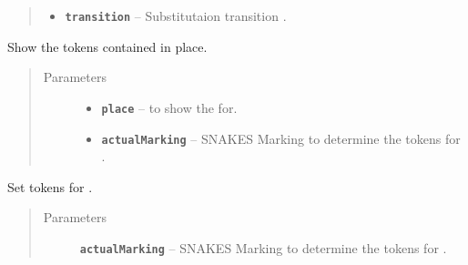 \documentclass[a4paper,10pt,english]{sphinxmanual}
\begin{document}
\begin{fulllineitems}
\begin{fulllineitems}
\begin{quote}
\begin{description}
\begin{itemize}
\item {} 
\textbf{\texttt{transition}} -- Substitutaion transition .

\end{itemize}

\end{description}\end{quote}

\end{fulllineitems}


\begin{fulllineitems}
\label{gui_link:gui.DiagramEditor.DiagramEditor.setTokenForPlace}
Show the tokens contained in place.
\begin{quote}\begin{description}
\item[{Parameters}] \leavevmode\begin{itemize}
\item {} 
\textbf{\texttt{place}} --  to show the  for.

\item {} 
\textbf{\texttt{actualMarking}} -- SNAKES Marking to determine the tokens for .

\end{itemize}

\end{description}\end{quote}

\end{fulllineitems}


\begin{fulllineitems}
\label{gui_link:gui.DiagramEditor.DiagramEditor.setTokens}
Set tokens for .
\begin{quote}\begin{description}
\item[{Parameters}] \leavevmode
\textbf{\texttt{actualMarking}} -- SNAKES Marking to determine the tokens for .

\end{description}\end{quote}


\end{fulllineitems}
\end{fulllineitems}
\end{document}
